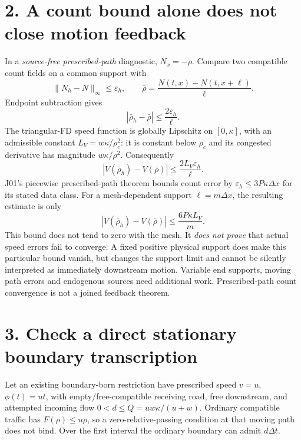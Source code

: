 \documentclass[11pt,a4paper]{article}
\begin{document}
\newpage
\section*{2. A count bound alone does not close motion feedback}
In a \emph{source-free prescribed-path} diagnostic, $N_x=-\rho$. Compare
two compatible count fields on a common support with
\begin{equation}
 \|N_h-N\|_\infty\le\varepsilon_h,\qquad
 \bar\rho=\frac{N(t,x)-N(t,x+\ell)}{\ell}.
\end{equation}
Endpoint subtraction gives
\begin{equation}
 |\bar\rho_h-\bar\rho|\le\frac{2\varepsilon_h}{\ell}.
\end{equation}
The triangular-FD speed function is globally Lipschitz on $[0,\kappa]$,
with an admissible constant $L_V=w\kappa/\rho_c^2$: it is constant below
$\rho_c$ and its congested derivative has magnitude $w\kappa/\rho^2$.
Consequently
\begin{equation}
 |V(\bar\rho_h)-V(\bar\rho)|\le
 \frac{2L_V\varepsilon_h}{\ell}.
\end{equation}
J01's piecewise prescribed-path theorem bounds count error by
$\varepsilon_h\le3P\kappa\Delta x$ for its stated data class. For a
mesh-dependent support $\ell=m\Delta x$, the resulting estimate is only
\begin{equation}
 |V(\bar\rho_h)-V(\bar\rho)|\le\frac{6P\kappa L_V}{m}.
\end{equation}
This bound does not tend to zero with the mesh. It \emph{does not prove}
that actual speed errors fail to converge. A fixed positive physical support
does make this particular bound vanish, but changes the support limit and
cannot be silently interpreted as immediately downstream motion. Variable
end supports, moving path errors and endogenous sources need additional work.
Prescribed-path count convergence is not a joined feedback theorem.

\section*{3. Check a direct stationary boundary transcription}
Let an existing boundary-born restriction have prescribed speed $v=u$,
$\phi(t)=ut$, with empty/free-compatible receiving road, free downstream,
and attempted incoming flow $0<d\le Q=uw\kappa/(u+w)$. Ordinary compatible
traffic has $F(\rho)\le u\rho$, so a zero-relative-passing condition at that
moving path does not bind. Over the first interval the ordinary boundary can
admit $d\Delta t$.
\end{document}
